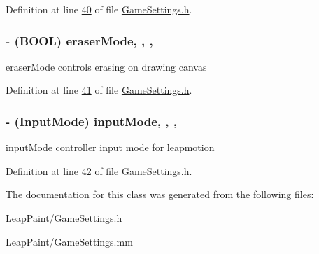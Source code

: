 Definition at line \hyperlink{_game_settings_8h_source_l00040}{40} of file \hyperlink{_game_settings_8h_source}{Game\-Settings.\-h}.

\hypertarget{interface_game_settings_ab192ff4717d84e69f4e3a32a4e38d6b8}{
\subsubsection[{eraser\-Mode}]{\setlength{\rightskip}{0pt plus 5cm}-\/ (B\-O\-O\-L) eraser\-Mode\hspace{0.3cm}{\ttfamily [read]}, {\ttfamily [write]}, {\ttfamily [nonatomic]}, {\ttfamily [assign]}}}\label{d1/d0c/interface_game_settings_ab192ff4717d84e69f4e3a32a4e38d6b8}
eraser\-Mode controls erasing on drawing canvas 

Definition at line \hyperlink{_game_settings_8h_source_l00041}{41} of file \hyperlink{_game_settings_8h_source}{Game\-Settings.\-h}.

\hypertarget{interface_game_settings_a57e428fbdeeb3dbffa09bb7ffcf6b057}{
\subsubsection[{input\-Mode}]{\setlength{\rightskip}{0pt plus 5cm}-\/ (Input\-Mode) input\-Mode\hspace{0.3cm}{\ttfamily [read]}, {\ttfamily [write]}, {\ttfamily [nonatomic]}, {\ttfamily [assign]}}}\label{d1/d0c/interface_game_settings_a57e428fbdeeb3dbffa09bb7ffcf6b057}
input\-Mode controller input mode for leapmotion 

Definition at line \hyperlink{_game_settings_8h_source_l00042}{42} of file \hyperlink{_game_settings_8h_source}{Game\-Settings.\-h}.



The documentation for this class was generated from the following files\-:\begin{DoxyCompactItemize}
\item 
Leap\-Paint/Game\-Settings.\-h\item 
Leap\-Paint/Game\-Settings.\-mm\end{DoxyCompactItemize}
